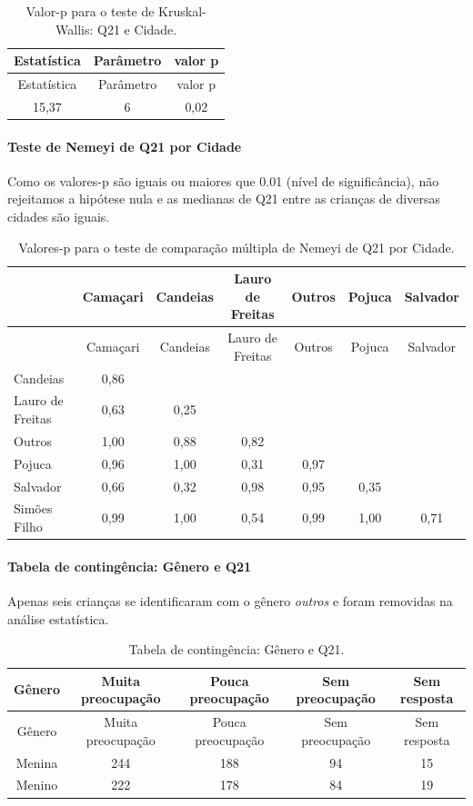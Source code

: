 \documentclass[]{article}
\let\oldparagraph\paragraph
\renewcommand{\paragraph}[1]{\oldparagraph{#1}\mbox{}}
\begin{document}
\begin{longtable}[]{@{}ccc@{}}
\caption{\label{tab:unnamed-chunk-432}Valor-p para o teste de Kruskal-Wallis: Q21 e Cidade.}\tabularnewline
\toprule
Estatística & Parâmetro & valor p\tabularnewline
\midrule
\endfirsthead
\toprule
Estatística & Parâmetro & valor p\tabularnewline
\midrule
\endhead
15,37 & 6 & 0,02\tabularnewline
\bottomrule
\end{longtable}

\hypertarget{teste-de-nemeyi-de-q21-por-cidade}{%
\paragraph{Teste de Nemeyi de Q21 por Cidade}\label{teste-de-nemeyi-de-q21-por-cidade}}

Como os valores-p são iguais ou maiores que 0.01 (nível de significância), não rejeitamos a hipótese nula e as medianas de Q21 entre as crianças de diversas cidades são iguais.

\begin{longtable}[]{@{}lcccccc@{}}
\caption{\label{tab:unnamed-chunk-434}Valores-p para o teste de comparação múltipla de Nemeyi de Q21 por Cidade.}\tabularnewline
\toprule
& Camaçari & Candeias & Lauro de Freitas & Outros & Pojuca & Salvador\tabularnewline
\midrule
\endfirsthead
\toprule
& Camaçari & Candeias & Lauro de Freitas & Outros & Pojuca & Salvador\tabularnewline
\midrule
\endhead
Candeias & 0,86 & & & & &\tabularnewline
Lauro de Freitas & 0,63 & 0,25 & & & &\tabularnewline
Outros & 1,00 & 0,88 & 0,82 & & &\tabularnewline
Pojuca & 0,96 & 1,00 & 0,31 & 0,97 & &\tabularnewline
Salvador & 0,66 & 0,32 & 0,98 & 0,95 & 0,35 &\tabularnewline
Simões Filho & 0,99 & 1,00 & 0,54 & 0,99 & 1,00 & 0,71\tabularnewline
\bottomrule
\end{longtable}

\cleardoublepage

\hypertarget{tabela-de-continguxeancia-guxeanero-e-q21}{%
\paragraph{Tabela de contingência: Gênero e Q21}\label{tabela-de-continguxeancia-guxeanero-e-q21}}

Apenas seis crianças se identificaram com o gênero \emph{outros} e foram removidas na análise estatística.

\begin{longtable}[]{@{}ccccc@{}}
\caption{\label{tab:unnamed-chunk-435}Tabela de contingência: Gênero e Q21.}\tabularnewline
\toprule
Gênero & Muita preocupação & Pouca preocupação & Sem preocupação & Sem resposta\tabularnewline
\midrule
\endfirsthead
\toprule
Gênero & Muita preocupação & Pouca preocupação & Sem preocupação & Sem resposta\tabularnewline
\midrule
\endhead
Menina & 244 & 188 & 94 & 15\tabularnewline
Menino & 222 & 178 & 84 & 19\tabularnewline
\bottomrule
\end{longtable}
\end{document}
